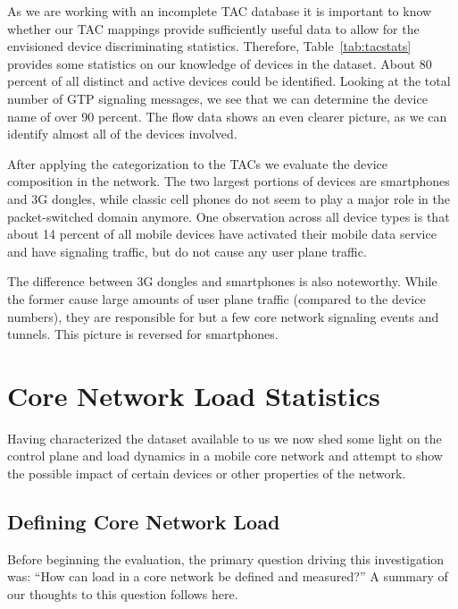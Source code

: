 As we are working with an incomplete \ac{TAC} database it is important to know whether our \ac{TAC} mappings provide sufficiently useful data to allow for the envisioned device discriminating statistics. Therefore, Table~\ref{tab:tacstats} provides some statistics on our knowledge of devices in the dataset. About 80 percent of all distinct and active devices could be identified. Looking at the total number of \ac{GTP} signaling messages, we see that we can determine the device name of over 90 percent. The flow data shows an even clearer picture, as we can identify almost all of the devices involved.

After applying the categorization to the \acp{TAC} we evaluate the device composition in the network. The two largest portions of devices are smartphones and 3G dongles, while classic cell phones do not seem to play a major role in the packet-switched domain anymore. One observation across all device types is that about 14 percent of all mobile devices have activated their mobile data service and have signaling traffic, but do not cause any user plane traffic.

The difference between 3G dongles and smartphones is also noteworthy. While the former cause large amounts of user plane traffic (compared to the device numbers), they are responsible for but a few core network signaling events and tunnels. This picture is reversed for smartphones.


\section{Core Network Load Statistics}
\label{sec:tunnelstats-IMC}

Having characterized the dataset available to us we now shed some light on the control plane and load dynamics in a mobile core network and attempt to show the possible impact of certain devices or other properties of the network. 


\subsection{Defining Core Network Load}

Before beginning the evaluation, the primary question driving this investigation was: ``How can load in a core network be defined and measured?'' A summary of our thoughts to this question follows here.

